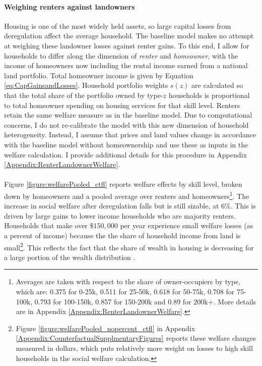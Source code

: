 \documentclass[12pt]{article}
\begin{document}
\paragraph*{Weighing renters against landowners} 

Housing is one of the most widely held assets, so large capital losses from deregulation affect the average household. The baseline model makes no attempt at weighing these landowner losses against renter gains. To this end, I allow for households to differ along the dimension of \textit{renter} and \textit{homeowner}, with the income of homeowners now including the rental income earned from a national land portfolio. Total homeowner income is given by Equation \eqref{eq:CapGainsandLosses}. Household portfolio weights $s(z)$ are calculated so that the total share of the portfolio owned by type-$z$ households is proportional to total homeowner spending on housing services for that skill level. Renters retain the same welfare measure as in the baseline model. Due to computational concerns, I do not re-calibrate the model with this new dimension of household heterogeneity. Instead, I assume that prices and land values change in accordance with the baseline model without homeownership and use these as inputs in the welfare calculation. I provide additional details for this procedure in Appendix \ref{Appendix:RenterLandownerWelfare}.

\paragraph*{}
Figure \ref{figure:welfarePooled_ctfl} reports welfare effects by skill level, broken down by homeowners and a pooled average over renters and homeowners\footnote{Averages are taken with respect to the share of owner-occupiers by type, which are: 0.375 for 0-25k, 0.511 for 25-50k, 0.618 for 50-75k, 0.708 for 75-100k, 0.793 for 100-150k,  0.857 for 150-200k and 0.89 for 200k+. More details are in Appendix \ref{Appendix:RenterLandownerWelfare}.}. The increase in social welfare after deregulation falls but is still sizable, at $6 \%$. This is driven by large gains to lower income households who are majority renters. Households that make over $\$150,000$ per year experience small welfare losses (as a percent of income) because the the share of household income from land is small\footnote{Figure \ref{figure:welfarePooled_nopercent_ctfl} in Appendix \ref{Appendix:CounterfactualSupplmentaryFigures} reports these welfare changes measured in dollars, which puts relatively more weight on losses to high skill households in the social welfare calculation.}. This reflects the fact that the share of wealth in housing is decreasing for a large portion of the wealth distribution \citep{Greaney}.
\end{document}

